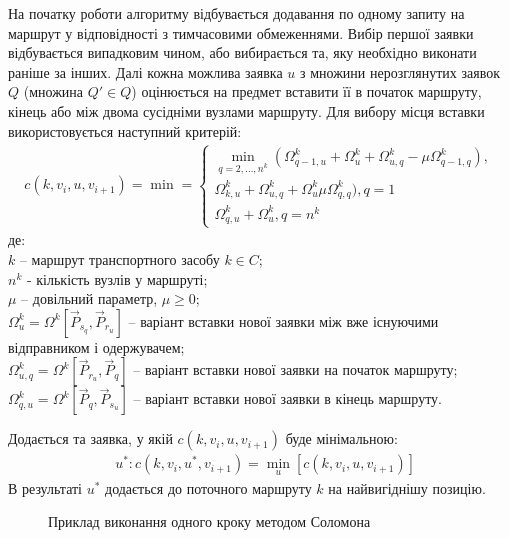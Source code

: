 \documentclass[]{TAACpaper}
\begin{document}
На початку роботи алгоритму відбувається додавання по одному запиту на маршрут у відповідності з тимчасовими обмеженнями. Вибір першої заявки відбувається випадковим чином, або вибирається та, яку необхідно виконати раніше за інших. Далі кожна можлива заявка $u$ з множини нерозглянутих заявок $Q$ (множина $Q' \in Q$) оцінюється на предмет вставити її в початок маршруту, кінець або між двома сусідніми вузлами маршруту. Для вибору місця вставки використовується наступний критерій:
\begin{align} 
	\label{insert_kr}
	c(k,v_i,u,v_{i+1}) = \min =
	\begin{cases}
		\min_{q=2,\dots,n^k}(\Omega_{q-1,u}^k+\Omega_{u}^{k}+\Omega_{u,q}^{k}-\mu \Omega_{q-1,q}^k),\\
		\Omega_{k,u}^k+\Omega_{u,q}^k+\Omega_{u}^k\mu \Omega_{q,q}^k), q=1\\
		\Omega_{q,u}^k+\Omega_{u}^k, q=n^k
	\end{cases}
\end{align} 
де:\\
$k$ -- маршрут транспортного засобу $k\in C$;\\
$n^k$ - кількість вузлів у маршруті;\\
$\mu$ -- довільний параметр, $\mu \ge 0 $;\\
$\Omega_{u}^k=\Omega^k[\vec{P}_{s_q}, \vec{P}_{r_u}]$ -- варіант вставки нової заявки між вже існуючими відправником і одержувачем;\\
$\Omega_{u,q}^k=\Omega^k[\vec{P}_{r_u}, \vec{P}_{q}]$ -- варіант вставки нової заявки на початок маршруту;\\
$\Omega_{q,u}^k=\Omega^k[\vec{P}_{q}, \vec{P}_{s_u}]$ -- варіант вставки нової заявки в кінець маршруту.

Додається та заявка, у якій $c(k,v_i,u,v_{i+1})$ буде мінімальною:
\begin{align} 
	\label{kriterij}
	& u^*:c(k,v_i,u^*,v_{i+1})=\min_{u}[c(k,v_i,u,v_{i+1})]
\end{align} 
В результаті $u^*$ додається до поточного маршруту $k$ на найвигіднішу позицію.
\begin{figure}[h]
	\caption{Приклад виконання одного кроку методом Соломона}
	\label{ris:pict1}
\end{figure}
\end{document}
